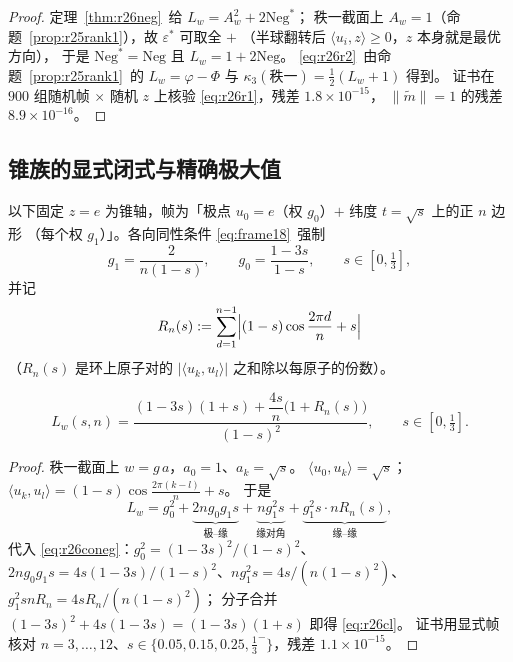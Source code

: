 \begin{proof}
定理~\ref{thm:r26neg}~给 $L_w=A_w^2+2\mathrm{Neg}^*$；
秩一截面上 $A_w=1$（命题~\ref{prop:r25rank1}），故 $\varepsilon^*$ 可取全 $+$
（半球翻转后 $\langle u_i,z\rangle\ge0$，$z$ 本身就是最优方向），
于是 $\mathrm{Neg}^*=\mathrm{Neg}$ 且 $L_w=1+2\mathrm{Neg}$。
\eqref{eq:r26r2}~由命题~\ref{prop:r25rank1}~的 $L_w=\varphi-\Phi$ 与
$\kappa_3(\text{秩一})=\frac12(L_w+1)$ 得到。
证书在 $900$ 组随机帧 $\times$ 随机 $z$ 上核验 \eqref{eq:r26r1}，残差 $1.8\times10^{-15}$，
$\|\widetilde m\|=1$ 的残差 $8.9\times10^{-16}$。
\end{proof}

\subsection{锥族的显式闭式与精确极大值}\label{sec:r26:cone}

以下固定 $z=e$ 为锥轴，帧为「极点 $u_0=e$（权 $g_0$）$+$ 纬度 $t=\sqrt s$ 上的正 $n$ 边形
（每个权 $g_1$）」。各向同性条件 \eqref{eq:frame18}~强制
\begin{equation}\label{eq:r26coneg}
g_1=\frac{2}{n(1-s)},\qquad g_0=\frac{1-3s}{1-s},\qquad s\in[0,\tfrac13],
\end{equation}
并记
\begin{equation}\label{eq:r26Rn}
R_n(s):=\sum_{d=1}^{n-1}\Bigl|(1-s)\cos\frac{2\pi d}n+s\Bigr|
\end{equation}
（$R_n(s)$ 是环上原子对的 $|\langle u_k,u_l\rangle|$ 之和除以每原子的份数）。

\begin{proposition}[锥族秩一截面的闭式]\label{prop:r26conecl}
\begin{equation}\label{eq:r26cl}
L_w(s,n)=\frac{(1-3s)(1+s)+\dfrac{4s}{n}\bigl(1+R_n(s)\bigr)}{(1-s)^2},
\qquad s\in[0,\tfrac13].
\end{equation}
\end{proposition}

\begin{proof}
秩一截面上 $w=g\,a$，$a_0=1$、$a_k=\sqrt s$。
$\langle u_0,u_k\rangle=\sqrt s$；$\langle u_k,u_l\rangle=(1-s)\cos\frac{2\pi(k-l)}n+s$。
于是
\[
L_w=g_0^2+\underbrace{2ng_0g_1s}_{\text{极--缘}}
+\underbrace{ng_1^2s}_{\text{缘对角}}+\underbrace{g_1^2s\cdot nR_n(s)}_{\text{缘--缘}},
\]
代入 \eqref{eq:r26coneg}：$g_0^2=(1-3s)^2/(1-s)^2$、
$2ng_0g_1s=4s(1-3s)/(1-s)^2$、$ng_1^2s=4s/(n(1-s)^2)$、
$g_1^2snR_n=4sR_n/(n(1-s)^2)$；
分子合并 $(1-3s)^2+4s(1-3s)=(1-3s)(1+s)$ 即得 \eqref{eq:r26cl}。
证书用显式帧核对 $n=3,\dots,12$、$s\in\{0.05,0.15,0.25,\frac13^-\}$，残差 $1.1\times10^{-15}$。
\end{proof}


